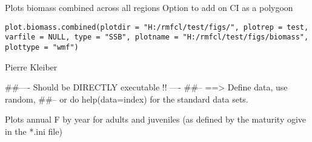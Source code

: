 \documentclass[a4paper]{book}
\begin{document}
%
\begin{Description}\relax

Plots biomass combined across all regions
Option to add on CI as a polygoon
\end{Description}
%
\begin{Usage}
\begin{verbatim}
plot.biomass.combined(plotdir = "H:/rmfcl/test/figs/", plotrep = test, varfile = NULL, type = "SSB", plotname = "H:/rmfcl/test/figs/biomass", plottype = "wmf")
\end{verbatim}
\end{Usage}
%
\begin{Arguments}
\begin{ldescription}
\item[\code{plotdir}] 


\item[\code{plotrep}] 


\item[\code{varfile}] 


\item[\code{type}] 


\item[\code{plotname}] 


\item[\code{plottype}] 


\end{ldescription}
\end{Arguments}
%
\begin{Author}\relax

Pierre Kleiber
\end{Author}
%
\begin{Examples}
\begin{ExampleCode}
##---- Should be DIRECTLY executable !! ----
##-- ==>  Define data, use random,
##--	or do  help(data=index)  for the standard data sets.

\end{ExampleCode}
\end{Examples}
%
\begin{Description}\relax

Plots annual F by year for adults and juveniles (as defined by the maturity ogive in the *.ini file)
\end{Description}
\end{document}
